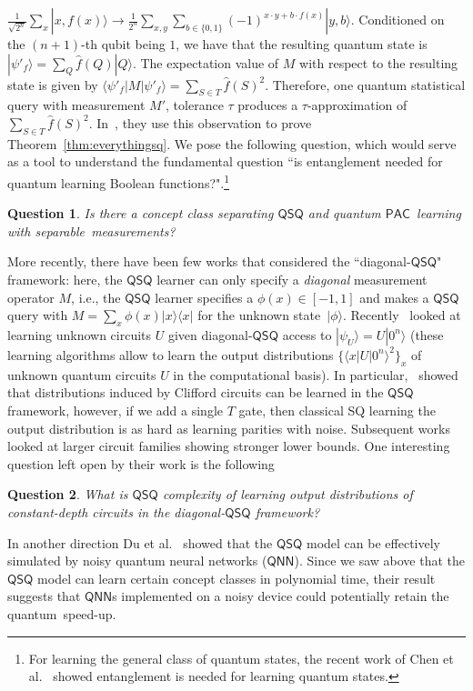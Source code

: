 \documentclass[11pt]{article}
\def\01{\{0,1\}}
\newcommand{\PAC}{\ensuremath{\mathsf{PAC}}}
\def\01{\{0,1\}}
\newcommand{\ket}[1]{|#1\rangle}
\newcommand{\ketbra}[2]{|#1\rangle\langle#2|}
\newtheorem{question}{Question}
\begin{document}
		$
		\frac{1}{\sqrt{2^{n}}}\sum_x\ket{x,f(x)}\rightarrow \frac{1}{2^n}\sum_{x,y}\sum_{b\in \01} (-1)^{x\cdot y+b\cdot f(x)}\ket{y,b}.
		$
        Conditioned on the $(n+1)$-th qubit being $1$, we have that the resulting quantum state is $\ket{\psi'_f}=\sum_Q \widehat{f}(Q)\ket{Q}$. The expectation value of $M$ with respect to the resulting state is given by
		$
		\langle\psi'_f\vert M\vert \psi'_f\rangle=\sum_{S\in T}\widehat{f}(S)^2.
		$
Therefore, one quantum statistical query with measurement $M'$,  tolerance $\tau$ produces a $\tau$-approximation of $\sum_{S\in T}\widehat{f}(S)^2$. In~\cite{arunachalam2020quantum}, they use this observation to prove Theorem~\ref{thm:everythingsq}. We pose the following question, which would serve as a tool to understand the fundamental question ``is entanglement needed for quantum learning Boolean functions?".\footnote{For learning the general class of quantum states, the recent work of Chen et al.~\cite{DBLP:conf/focs/ChenCH021} showed entanglement is needed for learning quantum states.}
\begin{question}
Is there a concept class separating $\mathsf{QSQ}$ and quantum  $\PAC$~learning with separable~measurements?
\end{question}
More recently, there have been few works that considered the ``diagonal-$\mathsf{QSQ}$" framework: here, the $\mathsf{QSQ}$ learner can only specify a \emph{diagonal} measurement operator $M$, i.e., the $\mathsf{QSQ}$ learner specifies a $\phi(x)\in [-1,1]$ and makes a $\mathsf{QSQ}$ query with $M=\sum_x \phi(x)\ketbra{x}{x}$ for the unknown state~$\ket{\phi}$. Recently~\cite{hinsche2021learnability,hinsche2022single,sweke23} looked at learning unknown circuits $U$ given diagonal-$\mathsf{QSQ}$ access to $\ket{\psi_U}=U\ket{0^n}$ (these learning algorithms allow to learn the output distributions $\{\langle x|U|0^n\rangle^2\}_x$ of unknown quantum circuits  $U$ in the computational basis).   In particular,~\cite{hinsche2022single} showed that distributions induced by Clifford circuits can be learned in the $\mathsf{QSQ}$ framework, however, if we add a single $T$ gate, then classical SQ learning the output distribution is as hard as learning parities with noise. Subsequent works~\cite{hinsche2021learnability,sweke23} looked at larger circuit families showing stronger lower bounds. One interesting question left open by their work is the following
\begin{question}
    What is $\mathsf{QSQ}$ complexity of learning output distributions of constant-depth circuits in the diagonal-$\mathsf{QSQ}$ framework? 
\end{question}
In another direction Du et al.~\cite{du2021learnability} showed that the $\mathsf{QSQ}$ model can be effectively simulated by noisy  quantum neural networks ($\textsf{QNN}$). Since we saw above that the $\mathsf{QSQ}$ model can learn certain concept classes  in polynomial time, their result suggests that $\textsf{QNN}$s implemented on a noisy device could potentially retain the quantum~speed-up. 
\end{document}
